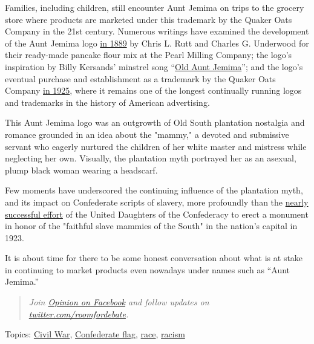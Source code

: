 Families, including children, still encounter Aunt Jemima on trips to
the grocery store where products are marketed under this trademark by
the Quaker Oats Company in the 21st century. Numerous writings have
examined the development of the Aunt Jemima logo
\href{//www.aaregistry.org/historic_events/view/nancy-green-original-aunt-jemima}{in
1889} by Chris L. Rutt and Charles G. Underwood for their ready-made
pancake flour mix at the Pearl Milling Company; the logo's inspiration
by Billy Kersands' minstrel song
``\href{https://books.google.com/books?id=kPJZTJtz1IwC\&pg=PA107\&dq=billy+kersands+\%22old+aunt+jemima\%22\&hl=en\&sa=X\&ei=8AiLVczlLci2-AGChYHYBA\&ved=0CCYQ6AEwAA\#v=onepage\&q=billy\%20kersands\%20\%22old\%20aunt\%20jemima\%22\&f=false}{Old
Aunt Jemima}''; and the logo's eventual purchase and establishment as a
trademark by the Quaker Oats Company
\href{//www.encyclopedia.chicagohistory.org/pages/2821.html}{in 1925},
where it remains one of the longest continually running logos and
trademarks in the history of American advertising.

This Aunt Jemima logo was an outgrowth of Old South plantation nostalgia
and romance grounded in an idea about the "mammy," a devoted and
submissive servant who eagerly nurtured the children of her white master
and mistress while neglecting her own. Visually, the plantation myth
portrayed her as an asexual, plump black woman wearing a headscarf.

Few moments have underscored the continuing influence of the plantation
myth, and its impact on Confederate scripts of slavery, more profoundly
than the
\href{//www.theatlantic.com/national/archive/2013/05/the-mammy-washington-almost-had/276431/}{nearly
successful effort} of the United Daughters of the Confederacy to erect a
monument in honor of the "faithful slave mammies of the South" in the
nation's capital in 1923.

It is about time for there to be some honest conversation about what is
at stake in continuing to market products even nowadays under names such
as ``Aunt Jemima.''

\begin{quote}
\emph{Join \href{//www.facebookcorewwwi.onion/nytopinion}{Opinion on
Facebook} and follow updates on
\href{//twitter.com/roomfordebate}{twitter.com/roomfordebate}.}
\end{quote}

Topics: \href{../../../../topics/civil-war}{Civil War},
\href{../../../../topics/confederate-flag}{Confederate flag},
\href{../../../../topics/race}{race},
\href{../../../../topics/racism}{racism}

